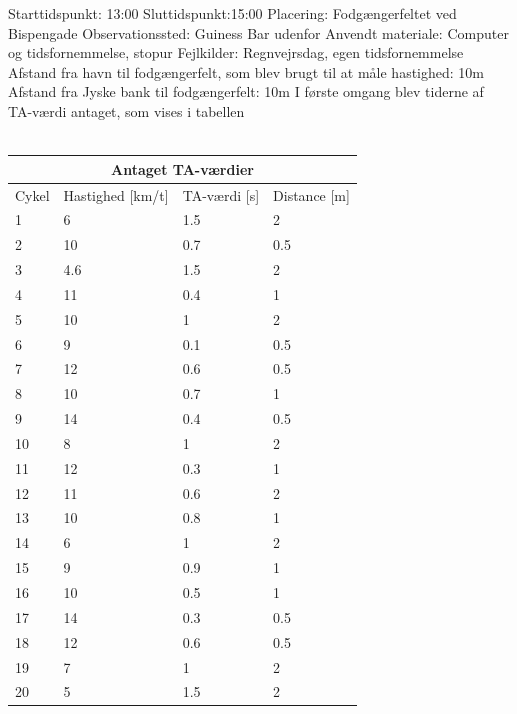 Starttidspunkt: 13:00
Sluttidspunkt:15:00
Placering: Fodgængerfeltet ved Bispengade
Observationssted: Guiness Bar udenfor
Anvendt materiale: Computer og tidsfornemmelse, stopur
Fejlkilder: Regnvejrsdag, egen tidsfornemmelse
Afstand fra havn til fodgængerfelt, som blev brugt til at måle hastighed: 10m
Afstand fra Jyske bank til fodgængerfelt: 10m
I første omgang blev tiderne af TA-værdi antaget, som vises i tabellen %
\\\\
\begin{tabular}{ |p{1cm}|p{4cm}|p{4cm}|p{4cm}|  }
\hline
\multicolumn{4}{|c|}{Antaget TA-værdier} \\
\hline
Cykel & Hastighed [km/t] & TA-værdi [s] & Distance [m] \\
\hline
1 & 6   & 1.5 & 2 \\
2 & 10  & 0.7 & 0.5 \\
3 & 4.6 & 1.5 & 2 \\
4 & 11  & 0.4 & 1 \\
5 & 10  & 1 & 2 \\
6 & 9   & 0.1 & 0.5 \\
7 & 12  & 0.6 & 0.5 \\
8 & 10  & 0.7 & 1 \\
9 & 14  & 0.4 & 0.5 \\
10 & 8  & 1   & 2 \\
11 & 12 &0.3  &  1 \\
12 & 11 & 0.6 &   2\\
13 & 10 & 0.8 & 1\\
14 & 6  & 1   & 2\\
15 & 9  & 0.9 & 1\\
16 & 10 & 0.5 & 1\\
17 & 14 & 0.3 &0.5\\
18 & 12 & 0.6 & 0.5\\
19 & 7  & 1 & 2\\
20 & 5  & 1.5 & 2\\
\hline
\end{tabular}



